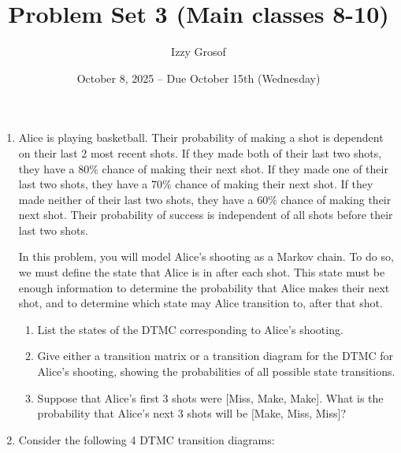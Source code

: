 \documentclass{article}
\title{Problem Set 3 (Main classes 8-10)}
\author{Izzy Grosof}
\date{October 8, 2025 -- Due October 15th (Wednesday)}
\begin{document}
\maketitle

\begin{enumerate}
    \item Alice is playing basketball. Their probability of making a shot is dependent on their last 2 most recent shots. If they made both of their last two shots, they have a $80\%$ chance of making their next shot. If they made one of their last two shots, they have a $70\%$ chance of making their next shot. If they made neither of their last two shots, they have a $60\%$ chance of making their next shot. Their probability of success is independent of all shots before their last two shots.

    In this problem, you will model Alice's shooting as a Markov chain. To do so, we must define the state that Alice is in after each shot. This state must be enough information to determine the probability that Alice makes their next shot, and to determine which state may Alice transition to, after that shot.
    \begin{enumerate}
        \item List the states of the DTMC corresponding to Alice's shooting.
        \item Give either a transition matrix or a transition diagram for the DTMC for Alice's shooting, showing the probabilities of all possible state transitions.
        \item Suppose that Alice's first 3 shots were [Miss, Make, Make]. What is the probability that Alice's next 3 shots will be [Make, Miss, Miss]?
    \end{enumerate}
    \item Consider the following 4 DTMC transition diagrams:
    
\end{enumerate}
\end{document}
